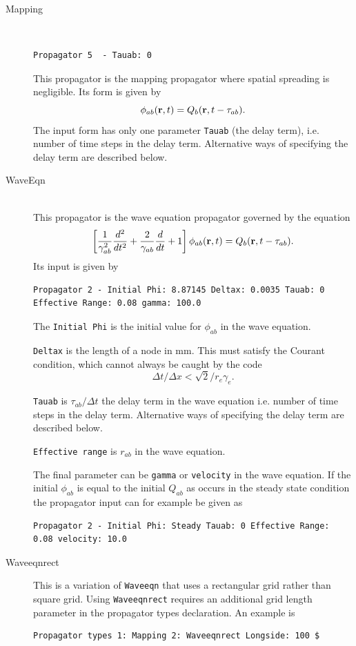 \documentclass[12pt,a4paper]{article}
\newcommand{\type}[1]{ {\small\small\tt #1} }
\begin{document}
\begin{description}
	\item[Mapping]\ \\
	\begin{lstlisting}
Propagator 5  - Tauab: 0
	\end{lstlisting}
	This propagator is the mapping propagator where spatial spreading is negligible. Its form is given by
	\[\phi_{ab}({\bf r}, t) = Q_b ({\bf r}, t - \tau_{ab}).\]
	The input form has only one parameter \type{Tauab} (the delay term), i.e. number of time steps in the delay term. Alternative ways of specifying the delay term are described below.

	\item[WaveEqn]\ \\
	This propagator is the wave equation propagator governed by the equation
	\[\left[\frac{1}{\gamma_{ab}^2}\frac{d^2}{d t^2}+\frac{2}{\gamma_{ab}}\frac{d} {d t}+1 \right] \phi_{ab}({\bf r},t) =Q_b({\bf r},t-\tau_{ab}).\]
	Its input is given by
	\begin{lstlisting}
Propagator 2 - Initial Phi: 8.87145 Deltax: 0.0035 Tauab: 0 Effective Range: 0.08 gamma: 100.0
	\end{lstlisting}
	The \type{Initial Phi} is the initial value for $\phi_{ab}$ in the wave equation.

	\type{Deltax} is the length of a node in mm. This must satisfy the Courant condition, which cannot always be caught by the code \[\Delta t/\Delta x<\sqrt{2}/r_e\gamma_e.\]

	\type{Tauab} is $\tau_{ab}/ \Delta t$ the delay term in the wave equation i.e. number of time steps in the delay term. Alternative ways of specifying the delay term are described below.

	\type{Effective range} is $r_{ab}$ in the wave equation.
	
	The final parameter can be \type{gamma} or \type{velocity} in the wave equation. If the initial $\phi_{ab}$ is equal to the initial $Q_{ab}$ as occurs in the steady state condition the propagator input can for example be given as
	\begin{lstlisting}
Propagator 2 - Initial Phi: Steady Tauab: 0 Effective Range: 0.08 velocity: 10.0
	\end{lstlisting}

	\item[Waveeqnrect]
		This is a variation of \type{Waveeqn} that uses a rectangular grid rather than square grid. Using \type{Waveeqnrect} requires an additional grid length parameter in the propagator types declaration. An example is
	\begin{lstlisting}
Propagator types 1: Mapping 2: Waveeqnrect Longside: 100 $
	\end{lstlisting}


\end{description}
\end{document}
